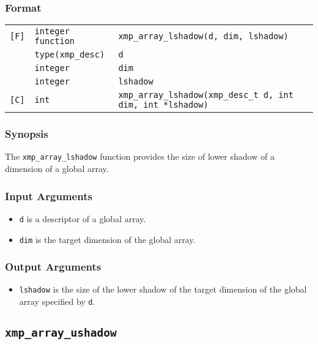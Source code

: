 \subsubsection*{Format}

\begin{tabular}{lll}

\verb![F]!& {\tt integer function}& {\tt xmp\_array\_lshadow(d, dim, lshadow)}\\
          & {\tt type(xmp\_desc)} & {\tt d}\\
          & {\tt integer} & {\tt dim}\\
          & {\tt integer} & {\tt lshadow}\\

\verb![C]!&  {\tt int}& {\tt xmp\_array\_lshadow(xmp\_desc\_t d, int dim, int *lshadow)}\\

\end{tabular}

\subsubsection*{Synopsis}

The {\tt xmp\_array\_lshadow} function provides the size of lower shadow
of a dimension of a global array.


\subsubsection*{Input Arguments}
\begin{itemize}
 \item {\tt d} is a descriptor of a global array.
 \item {\tt dim} is the target dimension of the global array.
\end{itemize}

\subsubsection*{Output Arguments}
\begin{itemize}
 \item {\tt lshadow} is the size of the lower shadow of the target
       dimension of the global array specified by {\tt d}.
\end{itemize}


\subsection{\tt xmp\_array\_ushadow}

